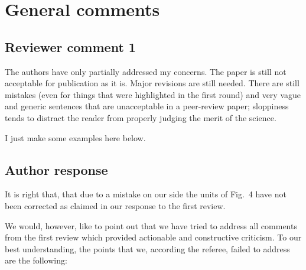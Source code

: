 \section{General comments}

\subsection*{Reviewer comment 1}

The authors have only partially addressed my concerns. The paper is still not
acceptable for publication as it is. Major revisions are still needed. There are
still mistakes (even for things that were highlighted in the first round) and
very vague and generic sentences that are unacceptable in a peer-review paper;
sloppiness tends to distract the reader from properly judging the merit of the
science.

 I just make some examples here below. 
\subsection*{Author response}

It is right that, that due to a mistake on our side the units of Fig.~4 have
not been corrected as claimed in our response to the first review.

We would, however, like to point out that we have tried to address all comments
from the first review which provided actionable and constructive criticism. To
our best understanding, the points that we, according the referee, failed to
address are the following:


